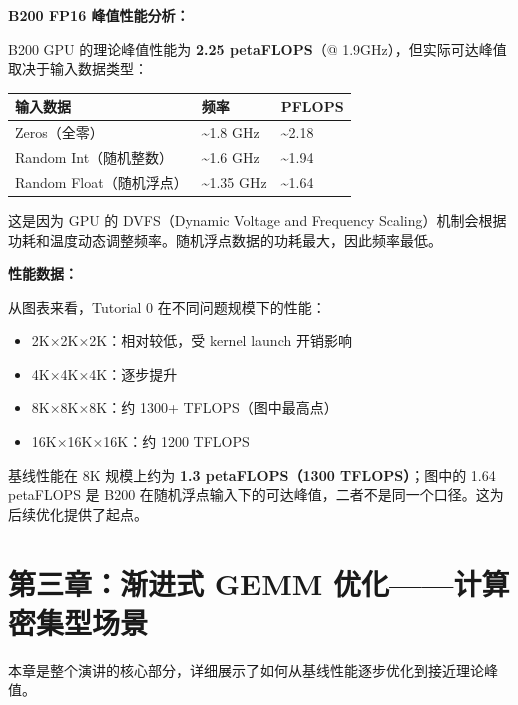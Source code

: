\textbf{B200 FP16 峰值性能分析：}

B200 GPU 的理论峰值性能为 \textbf{2.25 peta\allowbreak{}FLOPS}（@ 1.9\allowbreak{}GHz），但实际可达峰值取决于输入数据类型：

\begin{table}[htbp]\centering\small
\begin{adjustbox}{max width=\textwidth}
\begin{tabular}{lll}
\toprule
输入数据 & 频率 & PFLOPS \\
\midrule
Zeros（全零） & \textasciitilde{}1.8 GHz & \textasciitilde{}2.18 \\
Random Int（随机整数） & \textasciitilde{}1.6 GHz & \textasciitilde{}1.94 \\
Random Float（随机浮点） & \textasciitilde{}1.35 GHz & \textasciitilde{}1.64 \\
\bottomrule
\end{tabular}
\end{adjustbox}
\end{table}

这是因为 GPU 的 DVFS（Dynamic Voltage and Frequency Scaling）机制会根据功耗和温度动态调整频率。随机浮点数据的功耗最大，因此频率最低。

\textbf{性能数据：}

从图表来看，Tutorial 0 在不同问题规模下的性能：

\begin{itemize}
\item 2\allowbreak{}K×2\allowbreak{}K×2\allowbreak{}K：相对较低，受 kernel launch 开销影响
\item 4\allowbreak{}K×4\allowbreak{}K×4\allowbreak{}K：逐步提升
\item 8\allowbreak{}K×8\allowbreak{}K×8\allowbreak{}K：约 1300+ TFLOPS（图中最高点）
\item 16\allowbreak{}K×16\allowbreak{}K×16\allowbreak{}K：约 1200 TFLOPS
\end{itemize}

基线性能在 8\allowbreak{}K 规模上约为 \textbf{1.3 peta\allowbreak{}FLOPS（1300 TFLOPS）}；图中的 1.64 peta\allowbreak{}FLOPS
是 B200 在随机浮点输入下的可达峰值，二者不是同一个口径。这为后续优化提供了起点。

\section{第三章：渐进式 GEMM 优化——计算密集型场景}

本章是整个演讲的核心部分，详细展示了如何从基线性能逐步优化到接近理论峰值。

